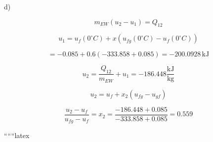 d) 

\[
m_{EW} (u_2 - u_1) = Q_{12}
\]

\[
u_1 = u_f(0^\circ C) + x (u_{fg}(0^\circ C) - u_f(0^\circ C))
\]

\[
= -0.085 + 0.6 (-333.858 + 0.085) = -200.0928 \, \text{kJ}
\]

\[
u_2 = \frac{Q_{12}}{m_{EW}} + u_1 = -186.448 \frac{\text{kJ}}{\text{kg}}
\]

\[
u_2 = u_f + x_2 (u_{fg} - u_{gf})
\]

\[
\frac{u_2 - u_f}{u_{fg} - u_f} = x_2 = \frac{-186.448 + 0.085}{-333.858 + 0.085} = 0.559
\]

``````latex